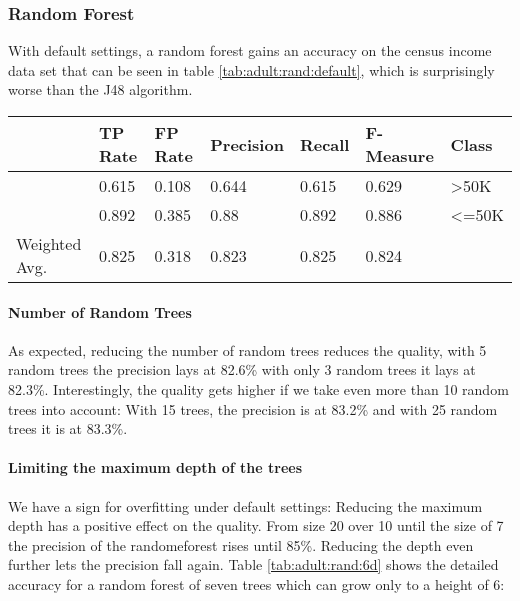 \documentclass[paper=a4, fontsize=11pt]{scrartcl} %
\numberwithin{equation}{section} %
\numberwithin{figure}{section} %
\numberwithin{table}{section} %
\begin{document}
\subsubsection{Random Forest}

With default settings, a random forest gains an accuracy on the census income data set that can be seen in table \ref{tab:adult:rand:default}, which is surprisingly worse than the J48 algorithm.
\begin{table*}[htb]\centering
  \begin{tabular*}{\columnwidth}{@{}lllllll@{}}
      \toprule 
              &  TP Rate & FP Rate & Precision & Recall & F-Measure & Class    \\  \midrule
              &  0.615   & 0.108   & 0.644     & 0.615  & 0.629     & >50K     \\     
              &  0.892   & 0.385   & 0.88      & 0.892  & 0.886     & <=50K    \\ 
Weighted Avg. &  0.825   & 0.318   & 0.823     & 0.825  & 0.824     &          \\ \bottomrule
    \end{tabular*}
\caption{Random Forest -- Default Settings} 
\label{tab:adult:rand:default}
\end{table*}
\FloatBarrier


\paragraph{Number of Random Trees}
As expected, reducing the number of random trees reduces the quality, with 5 random trees the precision lays at 82.6\% with only 3 random trees it lays at 82.3\%. Interestingly, the quality gets higher if we take even more than 10 random trees into account: With 15 trees, the precision is at 83.2\% and with 25 random trees it is at 83.3\%.

\paragraph{Limiting the maximum depth of the trees}
We have a sign for overfitting under default settings: Reducing the maximum depth has a positive effect on the quality. From size 20 over 10 until the size of 7 the precision of the randomeforest rises until 85\%. Reducing the depth even further lets the precision fall again. Table \ref{tab:adult:rand:6d} shows the detailed accuracy for a random forest of seven trees which can grow only to a height of 6:
\end{document}
